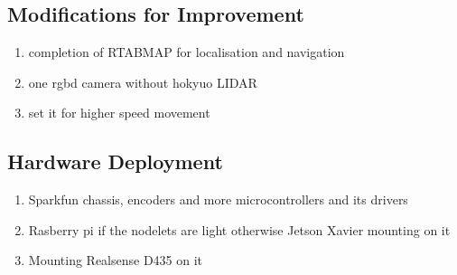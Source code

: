 \documentclass[10pt,journal,compsoc]{IEEEtran}
\begin{document}
\subsection{Modifications for Improvement}
\begin{enumerate}
      \item completion of RTABMAP for localisation and navigation
      \item one rgbd camera without hokyuo LIDAR
      \item set it for higher speed movement
      \end{enumerate}
\subsection{Hardware Deployment}
\begin{enumerate}
\item Sparkfun chassis, encoders and more microcontrollers and its drivers
\item Rasberry pi if the nodelets are light otherwise Jetson Xavier mounting on it
\item Mounting Realsense D435 on it
\end{enumerate}



\end{document}
